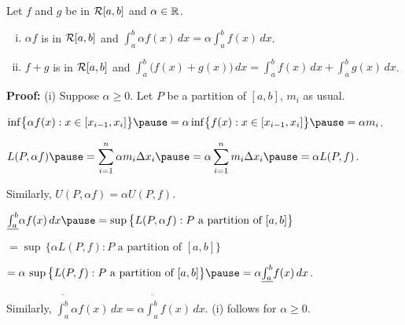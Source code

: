 \documentclass[10pt,aspectratio=169]{beamer}
\begin{document}
\begin{frame}

\begin{proposition}[Linearity]
Let $f$ and $g$ be in ${\mathcal{R}}[a,b]$ and $\alpha \in {\mathbb{R}}$.
\begin{enumerate}[(i)]
\item
\pause
$\alpha f$ is in ${\mathcal{R}}[a,b]$ and
$\int_a^b \alpha f(x) \,dx = \alpha \int_a^b f(x) \,dx$.
\item
\pause
$f+g$ is in ${\mathcal{R}}[a,b]$ and
$\int_a^b \bigl( f(x)+g(x) \bigr) \,dx = 
\int_a^b f(x) \,dx 
+
\int_a^b g(x) \,dx$.
\end{enumerate}
\end{proposition}

\pause
\textbf{Proof:}
(i) Suppose $\alpha \geq 0$.
\pause
\quad
Let $P$ be a partition of $[a,b]$, \quad $m_i$ as usual.


\pause
$\inf \bigl\{ \alpha f(x) : x \in [x_{i-1},x_i] \bigr\}
\pause
=
\alpha \inf \bigl\{ f(x) : x \in [x_{i-1},x_i] \bigr\}
\pause
= \alpha m_i$.

\pause
\medskip

$\displaystyle
L(P,\alpha f)
\pause
=
\sum_{i=1}^n \alpha m_i \Delta x_i
\pause
=
\alpha \sum_{i=1}^n m_i \Delta x_i
\pause
=
\alpha L(P,f)$.

\pause
\medskip

Similarly,
$U(P,\alpha f) = \alpha U(P,f)$.

\pause
\medskip

$%
\underline{\int_a^b} \alpha f(x)\,dx
\pause
=
\sup \, \bigl\{ L(P,\alpha f) : P \text{ a partition of } [a,b] \bigr\}
$

\pause
\qquad
$
=
\sup \, \bigl\{ \alpha L(P,f) : P \text{ a partition of } [a,b] \bigr\}
$

\pause
\qquad
$
=
\alpha \,
\sup \, \bigl\{ L(P,f) : P \text{ a partition of } [a,b] \bigr\}
\pause
=
\alpha
\underline{\int_a^b} f(x)\,dx
$.

\pause
Similarly,
$
\overline{\int_a^b} \alpha f(x)\,dx
=
\alpha
\overline{\int_a^b} f(x)\,dx$.
\pause
\wthus
(i) follows for $\alpha \geq 0$.

\end{frame}
\end{document}
